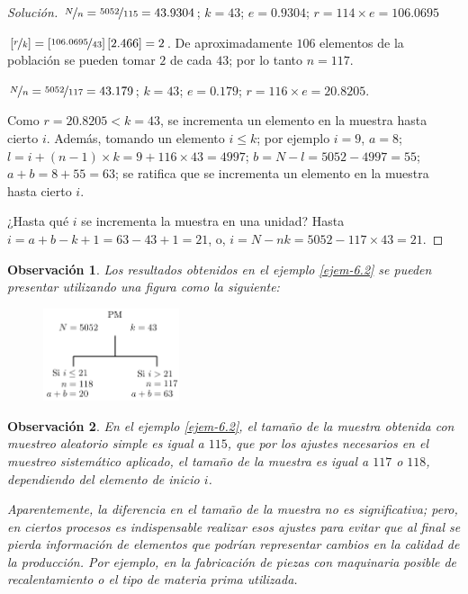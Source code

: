 \documentclass[a5paper,doc,10pt,noapacite]{apa6}
\newtheorem{observ}{Observación}
\begin{document}
{{\begin{proof}[Solución]
		\(\nicefrac{N}{n}=\nicefrac{5052}{115}=43.9304\); \(k=43\); \(e=0.9304\); \(r=114 \times e=106.0695\)
		
		\(\left[\nicefrac{r}{k}\right]=\left[\nicefrac{106.0695}{43}\right]\left[2.466\right]=2\). De aproximadamente \(106\) elementos de la población se pueden tomar \(2\) de cada \(43\); por lo tanto \(n=117\).
		
		\(\nicefrac{N}{n}=\nicefrac{5052}{117}=43.179\); \(k=43\); \(e=0.179\); \(r=116 \times e=20.8205\).
		
		Como \(r=20.8205<k=43\), se incrementa un elemento en la muestra hasta cierto \(i\). Además, tomando un elemento \(i\leq k\); por ejemplo \(i=9\), \(a=8\); \(l=i+(n-1) \times k=9+116 \times 43=4997\); \(b=N-l=5052-4997=55\); \(a+b=8+55=63\); se ratifica que se incrementa un elemento en la muestra hasta cierto \(i\).
		
		¿Hasta qué \(i\) se incrementa la muestra en una unidad?
		Hasta \(i=a+b-k+1=63-43+1=21\), o, \(i=N-nk=5052-117 \times 43=21\).
\end{proof}

\begin{observ}
	Los resultados obtenidos en el ejemplo \eqref{ejem-6.2} se pueden presentar utilizando una figura como la siguiente:
	
	\vspace{-1\baselineskip}
	\begin{figure}[h]
	\captionsetup{justification=centering, labelfont=footnotesize, font=footnotesize}
		\centering
		\includegraphics[width=4cm]{Graficos/e-figura1}
		
		\caption{}
		\label{fig:e-figura1}
	\end{figure}
\end{observ}

\begin{observ}
	En el ejemplo \eqref{ejem-6.2}, el tamaño de la muestra obtenida con muestreo aleatorio simple es igual a \(115\), que por los ajustes necesarios en el muestreo sistemático aplicado, el tamaño de la muestra es igual a \(117\) o \(118\), dependiendo del elemento de inicio \(i\).
	
	Aparentemente, la diferencia en el tamaño de la muestra no es significativa; pero, en ciertos procesos es indispensable realizar esos ajustes para evitar que al final se pierda información de elementos que podrían representar cambios en la calidad de la producción. Por ejemplo, en la fabricación de piezas con maquinaria posible de recalentamiento o el tipo de materia prima utilizada.
\end{observ}

}}
\end{document}
